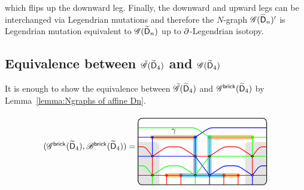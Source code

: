 which flips up the downward leg.
Finally, the downward and upward legs can be interchanged via Legendrian mutations and therefore the $N$-graph $\mathscr{G}(\widetilde{\mathsf{D}}_n)'$ is Legendrian mutation equivalent to $\mathscr{G}(\widetilde{\mathsf{D}}_n)$ up to $\partial$-Legendrian isotopy.

\subsection{Equivalence between $\tilde{\mathscr{G}}(\widetilde{\mathsf{D}}_4)$ and $\mathscr{G}(\widetilde{\mathsf{D}}_4)$}\label{appendix:affine D4}
It is enough to show the equivalence between $\tilde{\mathscr{G}}(\widetilde{\mathsf{D}}_4)$ and $\mathscr{G}^{\mathsf{brick}}(\widetilde{\mathsf{D}}_4)$ by Lemma~\ref{lemma:Ngraphs of affine Dn}.

\[
\begin{tikzcd}
(\ngraph^{\mathsf{brick}}(\exdynD_4),\nbasis^{\mathsf{brick}}(\exdynD_4))=
\begin{tikzpicture}[baseline=10ex, xscale=0.6, yscale=0.4]
\draw[rounded corners=5, thick] (0, 0) rectangle (9, 7);
\clip[rounded corners=5] (0, 0) rectangle (9, 7);
\fill[opacity=0.1, rounded corners] (-1, -1) rectangle (1.5, 4.5)
(7.5, 4.5) rectangle (9.5, -1);
\draw[color=cyclecolor1, line cap=round, line width=5, opacity=0.5]
(1,5)--(4,5) (5,5)--(8,5) (2,1)--(3,1) (6,1)--(7,1);
\draw (2.5, 5) node[above] {$\cycle$};
\draw[color=cyan, line cap=round, line width=5, opacity=0.5]
(3,1)--(6,1) (4,1)--(4,5) (5,1)--(5,5);
\draw[blue,thick,rounded corners]
(0,3)--(4,3) (4,3)--(5,1) (5,1)--(6,2)--(7,2)--(8,1) (8,1)--(8.5,2)--(9,2)
(0,5)--(4,5) (4,5)--(5,6)--(9,6)
(1,3)--(1,5) (4,3)--(4,5) (5,0)--(5,1) (8,0)--(8,1);
\draw[red,thick,rounded corners] (0,1)--(9,1)
(0,4)--(0.5,4)--(1,3) (1,3)--(2,4)--(3,4)--(4,3) (4,3)--(5,3) (5,3)--(6,4)--(7,4)--(8,3) (8,3)--(8.5,4)--(9,4)
(2,0)--(2,1) (3,0)--(3,1) (6,0)--(6,1) (7,0)--(7,1)
(1,1)--(1,3) (4,1)--(4,3) (5,1)--(5,3) (8,1)--(8,3);
\draw[green,thick,rounded corners]
(0,2)--(0.5,2)--(1,1) (1,1)--(2,2)--(3,2)--(4,1) (4,1)--(5,3) (5,3)--(9,3)
(0,6)--(4,6)--(5,5)--(9,5)
(1,0)--(1,1) (4,0)--(4,1) (5,3)--(5,5) (8,3)--(8,5);
\draw[fill, blue, thick]
(1,5) circle (2pt) (4,5) circle (2pt);
\draw[fill, red, thick]
(2,1) circle (2pt) (3,1) circle (2pt) 
(6,1) circle (2pt) (7,1) circle (2pt);
\draw[fill, green, thick]
(5,5) circle (2pt) (8,5) circle (2pt);
\draw[fill=white, thick]
(1,1) circle (2pt) (4,1) circle (2pt) (5,1) circle (2pt) (8,1) circle (2pt) (1,3) circle (2pt) (4,3) circle (2pt) (5,3) circle (2pt) (8,3) circle (2pt);
\end{tikzpicture}
\end{tikzcd}
\]
